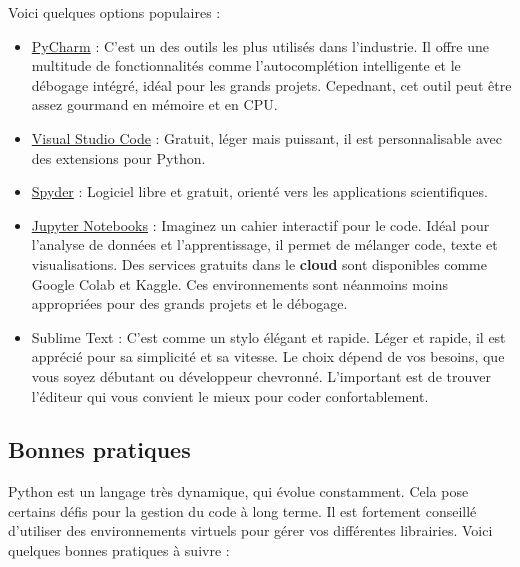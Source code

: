 \documentclass[11pt]{article}
\begin{document}
Voici quelques options populaires :

\begin{itemize}
\item
  \href{https://www.jetbrains.com/pycharm/}{PyCharm} : C'est un des
  outils les plus utilisés dans l'industrie. Il offre une multitude de
  fonctionnalités comme l'autocomplétion intelligente et le débogage
  intégré, idéal pour les grands projets. Cepednant, cet outil peut être
  assez gourmand en mémoire et en CPU.
\item
  \href{https://code.visualstudio.com/}{Visual Studio Code} : Gratuit,
  léger mais puissant, il est personnalisable avec des extensions pour
  Python.
\item
  \href{https://www.spyder-ide.org/}{Spyder} : Logiciel libre et
  gratuit, orienté vers les applications scientifiques.
\item
  \href{https://jupyter.org/}{Jupyter Notebooks} : Imaginez un cahier
  interactif pour le code. Idéal pour l'analyse de données et
  l'apprentissage, il permet de mélanger code, texte et visualisations.
  Des services gratuits dans le \textbf{cloud} sont disponibles comme
  Google Colab et Kaggle. Ces environnements sont néanmoins moins
  appropriées pour des grands projets et le débogage.
\item
  Sublime Text : C'est comme un stylo élégant et rapide. Léger et
  rapide, il est apprécié pour sa simplicité et sa vitesse. Le choix
  dépend de vos besoins, que vous soyez débutant ou développeur
  chevronné. L'important est de trouver l'éditeur qui vous convient le
  mieux pour coder confortablement.
\end{itemize}

\hypertarget{bonnes-pratiques}{%
\subsection{Bonnes pratiques}\label{bonnes-pratiques}}

Python est un langage très dynamique, qui évolue constamment. Cela pose
certains défis pour la gestion du code à long terme. Il est fortement
conseillé d'utiliser des environnements virtuels pour gérer vos
différentes librairies. Voici quelques bonnes pratiques à suivre :
\end{document}
